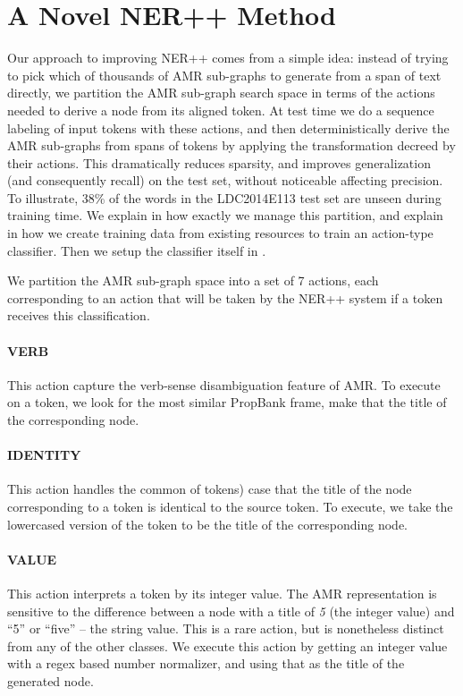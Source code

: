 \documentclass[11pt]{article}
\newcommand\n[1]{\textit{#1}} %
\begin{document}
\section{A Novel NER++ Method}\label{sec:nerplusplus}
Our approach to improving NER++ comes from a simple idea: instead of trying to pick 
  which of thousands of AMR sub-graphs to generate from a span of text directly, 
  we partition the AMR sub-graph search space in terms of the actions needed to 
  derive a node from its aligned token. 
At test time we do a sequence labeling of input tokens with these actions, and 
  then deterministically derive the AMR sub-graphs from spans of tokens by applying 
  the transformation decreed by their actions. 
This dramatically reduces sparsity, and improves generalization (and consequently
  recall) on the test set, without noticeable affecting precision.
To illustrate, 38\% of the words in the LDC2014E113 test set are 
  unseen during training time.
We explain in  how exactly we manage this partition, and explain in  how we create training data from existing resources to train an action-type classifier. Then we setup the classifier itself in .


We partition the AMR sub-graph space into a set of 7 actions, each corresponding to an action that will be taken by the NER++ system if a token receives this classification.

\paragraph{VERB} This action capture the verb-sense disambiguation feature of AMR. To execute on a token, we look for the most similar PropBank frame, make that the title of the corresponding node.

\paragraph{IDENTITY} This action handles the common of tokens) case that the title of the node corresponding to a token is identical to the source token. To execute, we take the lowercased version of the token to be the title of the corresponding node.

\paragraph{VALUE} This action interprets a token by its integer value. 
The AMR representation is sensitive to the difference between a node with a title
  of \n{5} (the integer value) and ``5'' or ``five'' -- the string value.
This is a rare action, but is nonetheless distinct from any of the other classes.
We execute this action by getting an integer value with a regex based number normalizer, and using that as the title of the generated node.
\end{document}
